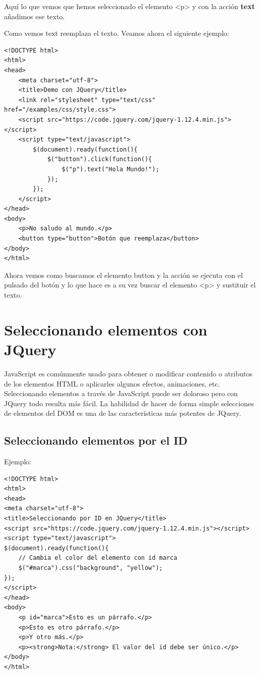 \documentclass[a4paper, oneside]{article}
\begin{document}
Aquí lo que vemos que hemos seleccionado el elemento <p> y con la acción \textbf{text} añadimos ese texto. 

Como vemos text reemplaza el texto. Veamos ahora el siguiente ejemplo:

\begin{verbatim}
<!DOCTYPE html>
<html>
<head>
    <meta charset="utf-8">
    <title>Demo con JQuery</title>
    <link rel="stylesheet" type="text/css" href="/examples/css/style.css">
    <script src="https://code.jquery.com/jquery-1.12.4.min.js"></script>
    <script type="text/javascript">
        $(document).ready(function(){
            $("button").click(function(){
                $("p").text("Hola Mundo!");
            });            
        });
    </script>
</head>
<body>
    <p>No saludo al mundo.</p>
    <button type="button">Botón que reemplaza</button>
</body>
</html>  
\end{verbatim}

Ahora vemos como buscamos el elemento button y la acción se ejecuta con el pulsado del botón y lo que hace es a su vez buscar el elemento <p> y sustituir el texto. 

\section{Seleccionando elementos con JQuery}
\label{sec:org265522e}

JavaScript es comúnmente usado para obtener o modificar contenido o atributos de los elementos HTML o aplicarles algunos efectos, animaciones, etc. 
Seleccionando elementos a través de JavaScript puede ser doloroso pero con JQuery todo resulta más fácil. La habilidad de hacer de forma simple selecciones de elementos del DOM es una de las características más potentes de JQuery. 

\subsection{Seleccionando elementos por el ID}
\label{sec:org354084a}

Ejemplo:

\begin{verbatim}
<!DOCTYPE html>
<html>
<head>
<meta charset="utf-8">
<title>Seleccionando por ID en JQuery</title>
<script src="https://code.jquery.com/jquery-1.12.4.min.js"></script>
<script type="text/javascript">
$(document).ready(function(){
    // Cambia el color del elemento con id marca
    $("#marca").css("background", "yellow");
});
</script> 
</head>
<body>
    <p id="marca">Esto es un párrafo.</p>
    <p>Esto es otro párrafo.</p>
    <p>Y otro más.</p>
    <p><strong>Nota:</strong> El valor del id debe ser único.</p>
</body>
</html>                                		
\end{verbatim}
\end{document}
